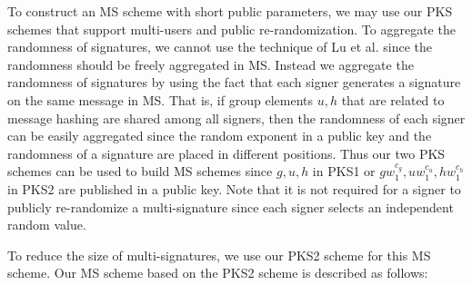 \documentclass[11pt,letterpaper]{article}
\begin{document}
To construct an MS scheme with short public parameters, we may use our PKS
schemes that support multi-users and public re-randomization. To aggregate
the randomness of signatures, we cannot use the technique of Lu et al.
\cite{LuOSSW06} since the randomness should be freely aggregated in MS.
Instead we aggregate the randomness of signatures by using the fact that each
signer generates a signature on the same message in MS. That is, if group
elements $u, h$ that are related to message hashing are shared among all
signers, then the randomness of each signer can be easily aggregated since
the random exponent in a public key and the randomness of a signature are
placed in different positions. Thus our two PKS schemes can be used to build
MS schemes since $g, u, h$ in PKS1 or $g w_1^{c_g}, u w_1^{c_u}, h w_1^{c_h}$
in PKS2 are published in a public key. Note that it is not required for a
signer to publicly re-randomize a multi-signature since each signer selects
an independent random value.

To reduce the size of multi-signatures, we use our PKS2 scheme for this MS
scheme. Our MS scheme based on the PKS2 scheme is described as follows:
\end{document}
